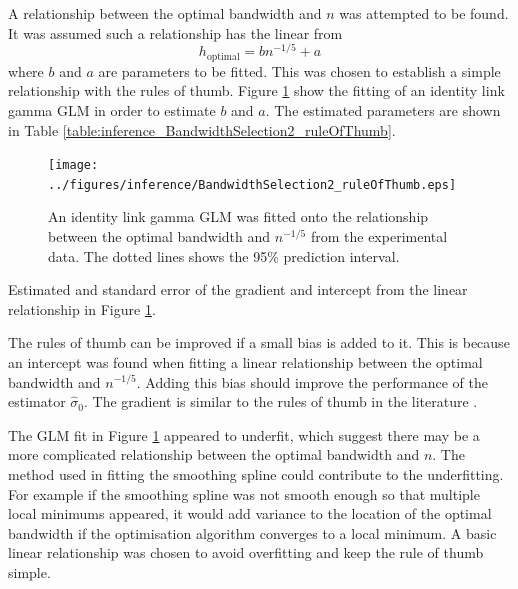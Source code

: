 A relationship between the optimal bandwidth and $n$ was attempted to be found. It was assumed such a relationship has the linear from
\begin{equation}
  h_{\text{optimal}} = b n^{-1/5} + a
\end{equation}
where $b$ and $a$ are parameters to be fitted. This was chosen to establish a simple relationship with the rules of thumb. Figure \ref{fig:inference_BandwidthSelection2_ruleOfThumb} show the fitting of an identity link gamma GLM in order to estimate $b$ and $a$. The estimated parameters are shown in Table \ref{table:inference_BandwidthSelection2_ruleOfThumb}.

\begin{figure}
  \centering
  \texttt{[image: ../figures/inference/BandwidthSelection2\_ruleOfThumb.eps]}
  \caption{An identity link gamma GLM was fitted onto the relationship between the optimal bandwidth and $n^{-1/5}$ from the experimental data. The dotted lines shows the 95\% prediction interval.}
  \label{fig:inference_BandwidthSelection2_ruleOfThumb}
\end{figure}

\begin{table}
  \centering
  
  \caption{Estimated and standard error of the gradient and intercept from the linear relationship in Figure \ref{fig:inference_BandwidthSelection2_ruleOfThumb}.}
  \label{table:inference_BandwidthSelection2_ruleOfThumb}
\end{table}

The rules of thumb can be improved if a small bias is added to it. This is because an intercept was found when fitting a linear relationship between the optimal bandwidth and $n^{-1/5}$. Adding this bias should improve the performance of the estimator $\widehat{\sigma}_0$. The gradient is similar to the rules of thumb in the literature \citep{sheather2004density}.

The GLM fit in Figure \ref{fig:inference_BandwidthSelection2_ruleOfThumb} appeared to underfit, which suggest there may be a more complicated relationship between the optimal bandwidth and $n$. The method used in fitting the smoothing spline could contribute to the underfitting. For example if the smoothing spline was not smooth enough so that multiple local minimums appeared, it would add variance to the location of the optimal bandwidth if the optimisation algorithm converges to a local minimum. A basic linear relationship was chosen to avoid overfitting and keep the rule of thumb simple.

